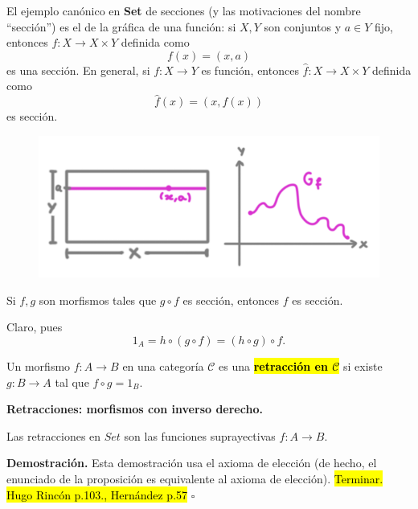 \documentclass[10pt]{article}
\newcommand{\hlgray}[1]{{\sethlcolor{Ivory2}\hl{#1}}}
\newcommand*{\QEDB}{\null\nobreak\hfill\ensuremath{\square}}%
\newtheorem[M]{teo}{Teorema}[section]
\newtheorem[M]{listaObj}[teo]{Lista de deseos}
\newtheorem[M]{preg}[teo]{Pregunta}
\newtheorem[M]{lema}[teo]{Lema}
\newtheorem[M]{hip}[teo]{Hipótesis}
\newtheorem[M]{prop}[teo]{Proposición}
\newtheorem[M]{obs}[teo]{Observación}
\newtheorem[M]{cor}[teo]{Corolario}
\newtheorem[M]{notacion}[teo]{Notación}
\newtheorem[M]{nota}[teo]{Nota}
\begin{document}
El ejemplo canónico en \textbf{Set} de secciones (y las motivaciones
del nombre ``sección'') es el de la gráfica de una función:
si $X, Y$ son conjuntos y $a \in Y$ fijo,
entonces $f: X \longrightarrow X \times Y$ definida como
\[
f(x) = (x, a)
\]
es una sección.
En general, si $f: X \longrightarrow Y$ es función, 
entonces $\hat{f}: X \longrightarrow X \times Y$
definida como
\[
\hat{f}(x) = (x, f(x))
\]
es sección.

\begin{figure}[H]
\centering
	\includegraphics[scale=2.5]{cat2} 
 \end{figure}

\begin{obs}
Si $f, g$ son morfismos tales que $g \circ f$ es sección, entonces $f$ 
es sección.
\end{obs}
Claro, pues
\[
1_{A} = h \circ (g \circ f) = (h \circ g) \circ f.
\]

\begin{defi}
Un morfismo $f: A \longrightarrow B$ en una categoría 
$\mathcal{C}$ es una \textbf{\hlgray{retracción en $\mathcal{C}$}}
si existe $g: B \longrightarrow A$ tal que $f \circ g = 1_{B}$.
\end{defi}

\begin{center}
\textbf{Retracciones: morfismos con inverso derecho.}
\end{center}

\begin{prop}
Las retracciones en $Set$ son las funciones suprayectivas 
$f: A \longrightarrow B$.
\end{prop}
\noindent
\textbf{Demostración.}
Esta demostración usa el axioma de elección (de hecho, el enunciado
de la proposición es equivalente al axioma de elección).
\hl{Terminar. Hugo Rincón p.103., Hernández p.57}
\QEDB
\vspace{0.2cm}
\end{document}
